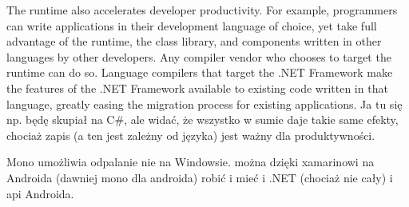The runtime also accelerates developer productivity. For example, programmers can write applications in their development language of choice, yet take full advantage of the runtime, the class library, and components written in other languages by other developers. Any compiler vendor who chooses to target the runtime can do so. Language compilers that target the .NET Framework make the features of the .NET Framework available to existing code written in that language, greatly easing the migration process for existing applications.
Ja tu się np. będę skupiał na C\#, ale widać, że wszystko w sumie daje takie same efekty, chociaż zapis (a ten jest zależny od języka) jest ważny dla produktywności.

Mono umożliwia odpalanie nie na Windowsie.
można dzięki xamarinowi na Androida (dawniej mono dla androida) robić i mieć i .NET (chociaż nie cały) i api Androida.

%
%
%
%
%
%

